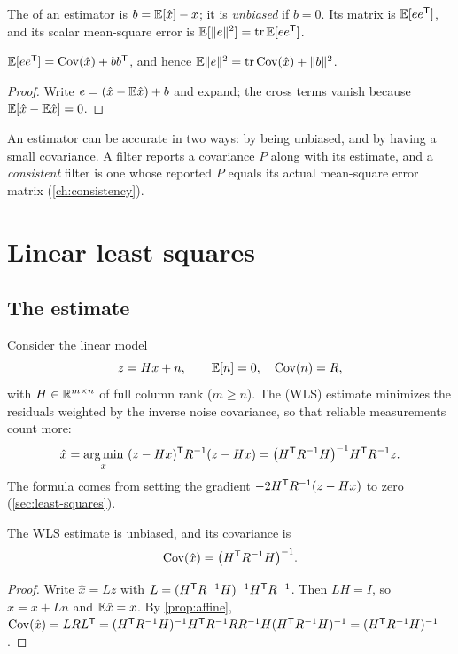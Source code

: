 \begin{definition}
The  of an estimator is $b = \mathbb{E}[\hat x] - x$; it is \emph{unbiased} if $b = 0$. Its  matrix is
$\mathbb{E}[ee^{\mathsf{T}}]$, and its scalar mean-square error is $\mathbb{E}[\|e\|^2] = \operatorname{tr}\mathbb{E}[ee^{\mathsf{T}}]$.
\end{definition}

\begin{proposition}
$\mathbb{E}[ee^{\mathsf{T}}] = \operatorname{Cov}(\hat x) + bb^{\mathsf{T}}$, and hence $\mathbb{E}\|e\|^2 = \operatorname{tr}\operatorname{Cov}(\hat x) + \|b\|^2$.
\end{proposition}
\begin{proof}
Write $e = (\hat x - \mathbb{E}\hat x) + b$ and expand; the cross terms vanish because $\mathbb{E}[\hat x - \mathbb{E}\hat x] = 0$.
\end{proof}

An estimator can be accurate in two ways: by being unbiased, and by having a small covariance. A filter reports a covariance $P$ along with its
estimate, and a \emph{consistent} filter is one whose reported $P$ equals its actual mean-square error matrix (\cref{ch:consistency}).

\section{Linear least squares}
\label{sec:linear-ls}

\subsection{The estimate}

Consider the linear model
\begin{equation}
  z = Hx + n, \qquad \mathbb{E}[n] = 0, \quad \operatorname{Cov}(n) = R,
  \label{eq:linear-model}
\end{equation}
with $H \in \mathbb{R}^{m\times n}$ of full column rank ($m \ge n$). The  (WLS) estimate minimizes the residuals weighted by the
inverse noise covariance, so that reliable measurements count more:
\begin{equation}
  \hat x = \operatorname*{arg\,min}_x\ (z - Hx)^{\mathsf{T}} R^{-1}(z - Hx) = \big(H^{\mathsf{T}} R^{-1} H\big)^{-1} H^{\mathsf{T}} R^{-1} z .
  \label{eq:wls}
\end{equation}
The formula comes from setting the gradient $-2H^{\mathsf{T}} R^{-1}(z - Hx)$ to zero (\cref{sec:least-squares}).

\begin{proposition}
\label{prop:wls-cov}
The WLS estimate is unbiased, and its covariance is
\begin{equation}
  \operatorname{Cov}(\hat x) = \big(H^{\mathsf{T}} R^{-1} H\big)^{-1} .
\end{equation}
\end{proposition}
\begin{proof}
Write $\hat x = Lz$ with $L = (H^{\mathsf{T}} R^{-1} H)^{-1} H^{\mathsf{T}} R^{-1}$. Then $LH = I$, so $\hat x = x + Ln$ and $\mathbb{E}\hat x = x$. By \cref{prop:affine},
$\operatorname{Cov}(\hat x) = LRL^{\mathsf{T}} = (H^{\mathsf{T}} R^{-1} H)^{-1} H^{\mathsf{T}} R^{-1} RR^{-1} H(H^{\mathsf{T}} R^{-1} H)^{-1} = (H^{\mathsf{T}} R^{-1} H)^{-1}$.
\end{proof}

